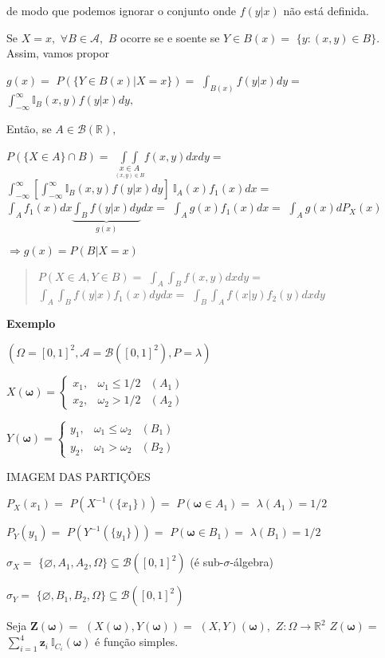 \documentclass[
]{book}
\begin{document}
de modo que podemos ignorar o conjunto onde \(f(y|x)\) não está definida.

Se \(X=x,\) \(\forall B \in \mathcal{A},\) \(B\) ocorre se e soente se \(Y \in B(x)=\) \(\{y:(x,y) \in B\}.\) Assim, vamos propor

\(g(x)=\) \(P(\{Y \in B(x)|X=x\})=\) \(\int_{B(x)}f(y|x)dy=\) \(\int_{-\infty}^\infty \mathbb{I}_B(x,y)f(y|x)dy,\)

Então, se \(A \in \mathcal{B}(\mathbb{R}),\)

\(P(\{X \in A\}\cap B)=\) \(\underset{\underset{(x,y)\in B}{x\in A}}{\int \int}f(x,y)dxdy=\) \(\int_{-\infty}^{\infty}\left[\int_{-\infty}^{\infty}\mathbb{I}_B(x,y)f(y|x)dy\right]~\mathbb{I}_A(x)f_1(x)dx=\) \(\int_Af_1(x)dx\underbrace{\int_Bf(y|x)dy}_{g(x)}dx=\) \(\int_Ag(x)f_1(x)dx=\) \(\int_Ag(x)dP_X(x)\)

\(\Rightarrow g(x)=P(B|X=x)\)

\begin{quote}
\(P(X\in A,Y \in B)=\) \(\int_A \int_Bf(x,y)dxdy=\) \(\int_A \int_Bf(y|x)f_1(x)dydx=\) \(\int_B \int_Af(x|y)f_2(y)dxdy\)
\end{quote}

\textbf{Exemplo}

\((\Omega=[0,1]^2, \mathcal{A}=\mathcal{B}([0,1]^2),P=\lambda)\)

\(X(\boldsymbol \omega)=\left\{\begin{array}{lll} x_1, & \omega_1 \leq 1/2 & (A_1)\\ x_2, & \omega_2 > 1/2 & (A_2)\end{array}\right.\)

\(Y(\boldsymbol \omega)=\left\{\begin{array}{lll} y_1, & \omega_1 \leq \omega_2 & (B_1)\\ y_2, & \omega_1 > \omega_2& (B_2)\end{array}\right.\)

IMAGEM DAS PARTIÇÕES

\(P_X(x_1)=\) \(P(X^{-1}(\{x_1\}))=\) \(P(\boldsymbol \omega \in A_1)=\) \(\lambda(A_1)=1/2\)

\(P_Y(y_1)=\) \(P(Y^{-1}(\{y_1\}))=\) \(P(\boldsymbol \omega \in B_1)=\) \(\lambda(B_1)=1/2\)

\(\sigma_X =\) \(\{\varnothing,A_1,A_2,\Omega\} \subseteq \mathcal{B}([0,1]^2)\) (é sub-\(\sigma\)-álgebra)

\(\sigma_Y =\) \(\{\varnothing,B_1,B_2,\Omega\} \subseteq \mathcal{B}([0,1]^2)\)

Seja \(\boldsymbol Z(\boldsymbol \omega)=\) \((X(\boldsymbol \omega), Y(\boldsymbol \omega))=\) \((X,Y)(\boldsymbol \omega),\) \(Z: \Omega\longrightarrow \mathbb{R}^2\) \(Z(\boldsymbol \omega)=\) \(\sum_{i=1}^4 \boldsymbol z_i ~\mathbb{I}_{C_i}(\boldsymbol \omega)\) é função simples.
\end{document}
